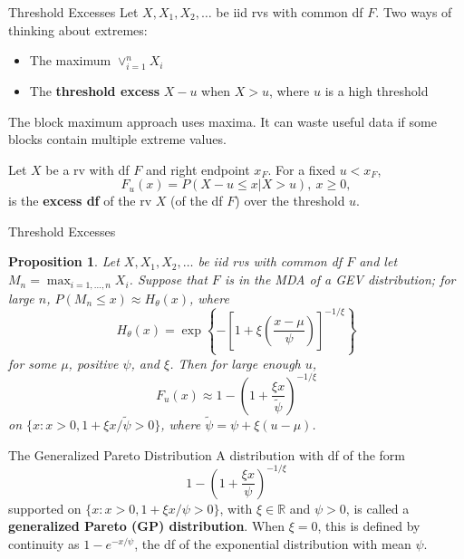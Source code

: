 \documentclass{beamer}
\newtheorem{proposition}{Proposition}
\begin{document}
\begin{frame}{Threshold Excesses}
    Let $X, X_1, X_2, \ldots$ be iid rvs with common df $F$. Two ways of thinking about extremes:
    \begin{itemize}
        \item The maximum $\vee_{i = 1}^n X_i$
        \item The \textbf{threshold excess} $X - u$ when $X > u$, where $u$ is a high threshold
    \end{itemize}
    The block maximum approach uses maxima. It can waste useful data if some blocks contain multiple extreme values.

    \begin{definition}
        Let $X$ be a rv with df $F$ and right endpoint $x_F$. For a fixed $u < x_F$,
        \[
        F_u(x) = P(X - u \le x | X > u), \ x \ge 0,
        \]
        is the \textbf{excess df} of the rv $X$ (of the df $F$) over the threshold $u$.
    \end{definition}
\end{frame}

\begin{frame}{Threshold Excesses}
    \begin{proposition} %
        Let $X, X_1, X_2, \ldots$ be iid rvs with common df $F$ and let $M_n = \max_{i = 1, \ldots, n} X_i$. Suppose that $F$ is in the MDA of a GEV distribution; for large $n$, $P(M_n \le x) \approx H_{\theta}(x)$, where
        \[
        H_{\theta}(x) = \exp\left\{-\left[1 + \xi\left(\frac{x - \mu}{\psi}\right)\right]^{-1 / \xi}\right\}
        \]
        for some $\mu$, positive $\psi$, and $\xi$. Then for large enough $u$,
        \[
        F_u(x) \approx 1 - \left(1 + \frac{\xi x}{\tilde{\psi}}\right)^{-1 / \xi}
        \]
        on $\{x : x > 0, 1 + \xi x / \tilde{\psi} > 0\}$, where $\tilde{\psi} = \psi + \xi(u - \mu)$.
    \end{proposition}
\end{frame}

\begin{frame}{The Generalized Pareto Distribution}
    A distribution with df of the form
    \[
    1 - \left(1 + \frac{\xi x}{\psi}\right)^{-1 / \xi}
    \]
    supported on $\{x : x > 0, 1 + \xi x / \psi > 0\}$, with $\xi \in \mathbb{R}$ and $\psi > 0$, is called a \textbf{generalized Pareto (GP) distribution}. When $\xi = 0$, this is defined by continuity as $1 - e^{-x / \psi}$, the df of the exponential distribution with mean $\psi$.
\end{frame}
\end{document}
